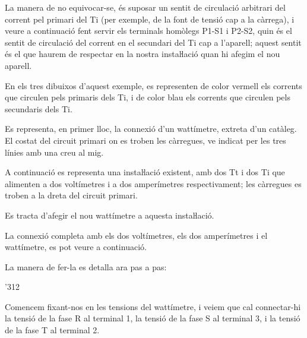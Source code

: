  La manera de no equivocar-se, és suposar un sentit de
circulació arbitrari del corrent  pel primari del Ti (per exemple,
de la font de tensió cap a la càrrega), i veure a continuació fent
servir els terminals homòlegs P1-S1 i P2-S2, quin és el sentit de
circulació del corrent en el secundari del Ti cap a l'aparell;
aquest sentit és el que haurem de respectar en la nostra
instaŀlació quan hi afegim el nou aparell.

	
\begin{exemple}[\ConnexWatt{}]
	\addcontentsxms{\ConnexWatt}
    En els tres dibuixos d'aquest exemple, es representen de color vermell els corrents que circulen pels primaris dels Ti, i de color blau els corrents que circulen pels secundaris dels Ti.

    Es representa, en primer lloc, la connexió d'un wattímetre, extreta
    d'un catàleg.   El costat del circuit primari on es troben les càrregues, ve indicat
    per les tres línies amb una creu al mig.

    \begin{center}
        
    \end{center}

    A continuació es representa una instaŀlació existent, amb dos Tt i
    dos Ti que alimenten a dos voltímetres i a dos amperímetres
    respectivament; les càrregues es troben a la dreta del circuit
    primari.

    \begin{center}
        
    \end{center}

    Es tracta d'afegir el nou wattímetre a aquesta
    instaŀlació.

    La connexió completa amb els dos voltímetres, els dos amperímetres i el wattímetre, es pot veure a continuació.
    
      \begin{center}
    	
    \end{center}

    La manera de fer-la es detalla ara pas a pas:

    \begin{dingautolist}{'312}

    \item Comencem fixant-nos en les tensions del wattímetre, i veiem que cal
    connectar-hi la tensió de la fase R al terminal 1, la tensió de la
    fase S al terminal 3, i la tensió de la fase T al terminal 2.


\end{dingautolist}
\end{exemple}
